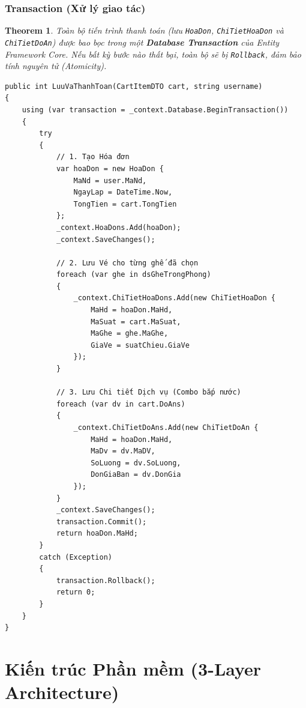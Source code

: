 \documentclass[12pt,a4paper,oneside]{book}
\theoremstyle{plain}
\newtheorem{thm}{Theorem}[chapter]
\numberwithin{equation}{chapter}
\begin{document}
\subsection{Transaction (Xử lý giao tác)}

\begin{thm}\label{thm_transaction}
    Toàn bộ tiến trình thanh toán (lưu \texttt{HoaDon}, \texttt{ChiTietHoaDon} và \texttt{ChiTietDoAn}) được bao bọc trong một \textbf{Database Transaction} của Entity Framework Core. Nếu bất kỳ bước nào thất bại, toàn bộ sẽ bị \texttt{Rollback}, đảm bảo tính nguyên tử (Atomicity).
\end{thm}

\begin{lstlisting}[style=csharpstyle, caption={Transaction trong \texttt{HoaDonBUS.LuuVaThanhToan()}}]
public int LuuVaThanhToan(CartItemDTO cart, string username)
{
    using (var transaction = _context.Database.BeginTransaction())
    {
        try
        {
            // 1. Tạo Hóa đơn
            var hoaDon = new HoaDon {
                MaNd = user.MaNd,
                NgayLap = DateTime.Now,
                TongTien = cart.TongTien
            };
            _context.HoaDons.Add(hoaDon);
            _context.SaveChanges();
            
            // 2. Lưu Vé cho từng ghế đã chọn
            foreach (var ghe in dsGheTrongPhong)
            {
                _context.ChiTietHoaDons.Add(new ChiTietHoaDon {
                    MaHd = hoaDon.MaHd,
                    MaSuat = cart.MaSuat,
                    MaGhe = ghe.MaGhe,
                    GiaVe = suatChieu.GiaVe
                });
            }
            
            // 3. Lưu Chi tiết Dịch vụ (Combo bắp nước)
            foreach (var dv in cart.DoAns)
            {
                _context.ChiTietDoAns.Add(new ChiTietDoAn {
                    MaHd = hoaDon.MaHd,
                    MaDv = dv.MaDV,
                    SoLuong = dv.SoLuong,
                    DonGiaBan = dv.DonGia
                });
            }
            _context.SaveChanges();
            transaction.Commit();   
            return hoaDon.MaHd;
        }
        catch (Exception)
        {
            transaction.Rollback(); 
            return 0;
        }
    }
}
\end{lstlisting}

\chapter{Kiến trúc Phần mềm (3-Layer Architecture)}
\end{document}
